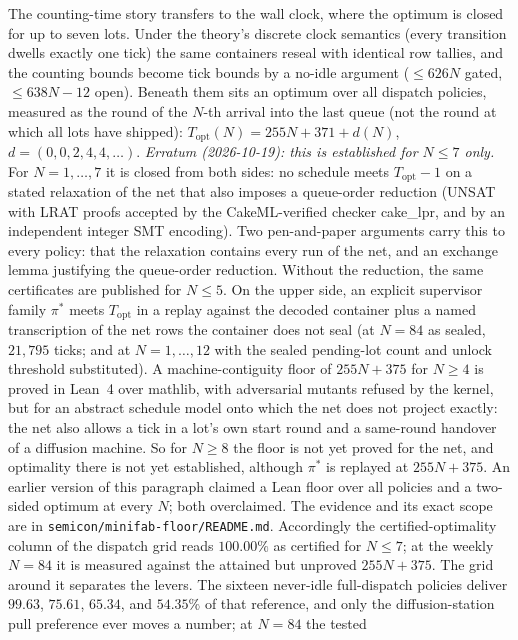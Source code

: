 The counting-time story transfers to the wall clock, where the
optimum is closed for up to seven lots. Under the theory's discrete clock semantics (every transition
dwells exactly one tick) the same containers reseal with identical
row tallies, and the counting bounds become tick bounds by a no-idle
argument ($\le 626N$ gated, $\le 638N - 12$ open). Beneath them sits
an optimum over all dispatch policies, measured as the round of the
$N$-th arrival into the last queue (not the round at which all lots
have shipped): $T_{\mathrm{opt}}(N) = 255N + 371 + d(N)$,
$d = (0, 0, 2, 4, 4, \dots)$. \emph{Erratum (2026-10-19): this is
established for $N \le 7$ only.} For $N = 1, \dots, 7$ it is closed
from both sides: no schedule meets $T_{\mathrm{opt}} - 1$ on a stated
relaxation of the net that also imposes a queue-order reduction (UNSAT
with LRAT proofs accepted by the CakeML-verified checker cake\_lpr, and
by an independent integer SMT encoding). Two
pen-and-paper arguments carry this to every policy: that the
relaxation contains every run of the net, and an exchange lemma
justifying the queue-order reduction. Without the reduction, the
same certificates are published for $N \le 5$.
On the upper side, an explicit supervisor family $\pi^*$ meets $T_{\mathrm{opt}}$ in a
replay against the decoded container plus a named transcription of
the net rows the container does not seal (at $N = 84$ as sealed,
$21{,}795$ ticks; and at $N = 1, \dots, 12$ with the sealed pending-lot
count and unlock threshold substituted). A
machine-contiguity floor of $255N + 375$ for $N \ge 4$ is proved in
Lean~4 over mathlib, with adversarial mutants refused by the kernel,
but for an abstract schedule model onto which the net does not
project exactly: the net also allows a tick in a lot's own start
round and a same-round handover of a diffusion machine. So for
$N \ge 8$ the floor is not yet proved for the net, and optimality
there is not yet established, although $\pi^*$ is replayed at $255N + 375$. An
earlier version of this paragraph claimed a Lean floor over all
policies and a two-sided optimum at every $N$; both overclaimed. The
evidence and its exact scope are in
\texttt{semicon/minifab-floor/README.md}. Accordingly the
certified-optimality column of the dispatch grid reads $100.00\%$ as
certified for $N \le 7$; at the weekly $N = 84$ it is measured
against the attained but unproved $255N + 375$. The grid
around it separates the levers. The sixteen never-idle full-dispatch
policies deliver $99.63$, $75.61$, $65.34$, and $54.35\%$ of
that reference, and only the diffusion-station
pull preference ever moves a number; at $N = 84$ the tested
